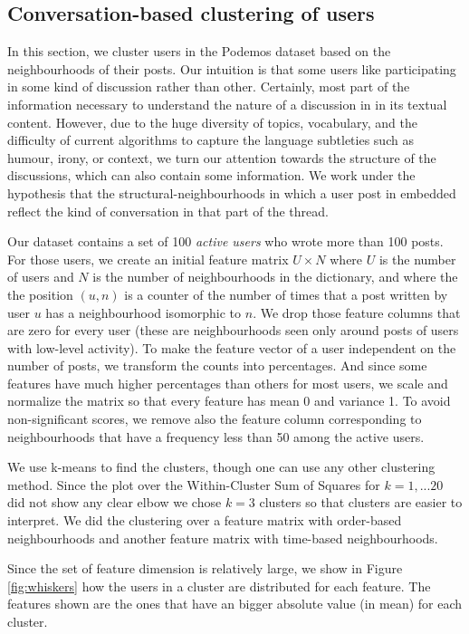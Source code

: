 \documentclass[conference]{IEEEtran}
\begin{document}
\subsection{Conversation-based clustering of users}
In this section, we cluster users in the Podemos dataset based on the neighbourhoods of their posts. Our intuition is that some users like participating in some kind of discussion rather than other. Certainly, most part of the information necessary to understand the nature of a discussion in in its textual content. However, due to the huge diversity of topics, vocabulary, and the difficulty of current algorithms to capture the language subtleties such as humour, irony, or context, we turn our attention towards the structure of the discussions, which can also contain some information. We work under the  hypothesis that the structural-neighbourhoods in which a user post in embedded reflect the kind of conversation in that part of the thread. 

Our dataset contains a set of 100 \textit{active users} who wrote more than 100 posts. For those users, we create an initial feature matrix $U\times N$ where $U$ is the number of users and $N$ is the number of neighbourhoods in the dictionary, and where the the position $(u,n)$ is a counter of the number of times that a post written by user $u$ has a neighbourhood isomorphic to $n$. We drop those feature columns that are zero for every user (these are neighbourhoods seen only around posts of users with low-level activity). To make the feature vector of a user independent on the number of posts, we transform the counts into percentages. And since some features have much higher percentages than others for most users, we scale and normalize the matrix so that every feature has mean 0 and variance 1. To avoid non-significant scores, we remove also the feature column corresponding to neighbourhoods that have a frequency less than 50 among the active users.

We use k-means to find the clusters, though one can use any other clustering method. Since the plot over the Within-Cluster Sum of Squares for $k=1,...20$ did not show any clear elbow we chose $k=3$ clusters so that clusters are easier to interpret. We did the clustering over a feature matrix with order-based neighbourhoods and another feature matrix with time-based neighbourhoods.

Since the set of feature dimension is relatively large, we show in Figure \ref{fig:whiskers} how the users in a cluster are distributed for each feature. The features shown are the ones that have an bigger absolute value (in mean) for each cluster.
\end{document}
